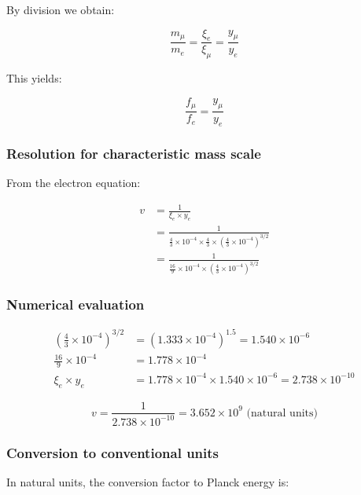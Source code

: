 \documentclass[12pt,a4paper]{report}
\begin{document}
By division we obtain:

\begin{equation}
	\frac{m_\mu}{m_e} = \frac{\xi_e}{\xi_\mu} = \frac{y_\mu}{y_e}
\end{equation}

This yields:

\begin{equation}
	\frac{f_\mu}{f_e} = \frac{y_\mu}{y_e}
\end{equation}

\subsubsection{Resolution for characteristic mass scale}

From the electron equation:

\begin{align}
	v &= \frac{1}{\xi_e \times y_e}\\
	&= \frac{1}{\frac{4}{3} \times 10^{-4} \times \frac{4}{3} \times \left(\frac{4}{3} \times 10^{-4}\right)^{3/2}}\\
	&= \frac{1}{\frac{16}{9} \times 10^{-4} \times \left(\frac{4}{3} \times 10^{-4}\right)^{3/2}}
\end{align}

\subsubsection{Numerical evaluation}

\begin{align}
	\left(\frac{4}{3} \times 10^{-4}\right)^{3/2} &= (1.333 \times 10^{-4})^{1.5} = 1.540 \times 10^{-6}\\
	\frac{16}{9} \times 10^{-4} &= 1.778 \times 10^{-4}\\
	\xi_e \times y_e &= 1.778 \times 10^{-4} \times 1.540 \times 10^{-6} = 2.738 \times 10^{-10}
\end{align}

\begin{equation}
	v = \frac{1}{2.738 \times 10^{-10}} = 3.652 \times 10^9 \text{ (natural units)}
\end{equation}

\subsubsection{Conversion to conventional units}

In natural units, the conversion factor to Planck energy is:
\end{document}
